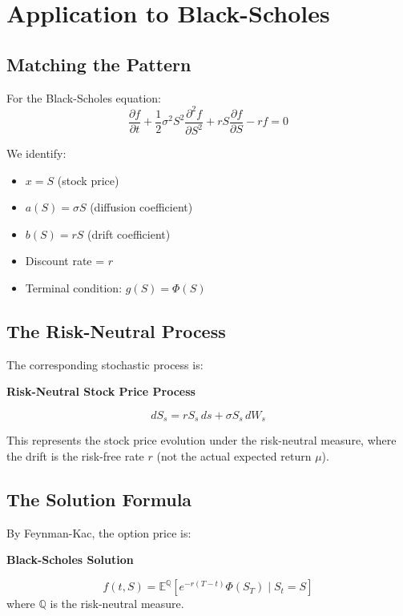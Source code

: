 \documentclass[11pt,a4paper]{article}
\newenvironment{keybox}[1][Key Result]
{\begin{leftbar}\noindent\textbf{\color{theoremblue}#1}\par\vspace{0.5em}}
{\end{leftbar}}
\begin{document}
\section{Application to Black-Scholes}

\subsection{Matching the Pattern}

For the Black-Scholes equation:
\begin{equation}
\frac{\partial f}{\partial t} + \frac{1}{2}\sigma^2 S^2 \frac{\partial^2 f}{\partial S^2} + rS \frac{\partial f}{\partial S} - rf = 0
\end{equation}

We identify:
\begin{itemize}
    \item $x = S$ (stock price)
    \item $a(S) = \sigma S$ (diffusion coefficient)
    \item $b(S) = rS$ (drift coefficient)
    \item Discount rate = $r$
    \item Terminal condition: $g(S) = \Phi(S)$
\end{itemize}

\subsection{The Risk-Neutral Process}

The corresponding stochastic process is:
\begin{keybox}[Risk-Neutral Stock Price Process]
\begin{equation}
dS_s = rS_s \, ds + \sigma S_s \, dW_s
\end{equation}
\end{keybox}

This represents the stock price evolution under the risk-neutral measure, where the drift is the risk-free rate $r$ (not the actual expected return $\mu$).

\subsection{The Solution Formula}

By Feynman-Kac, the option price is:
\begin{keybox}[Black-Scholes Solution]
\begin{equation}
f(t,S) = \mathbb{E}^{\mathbb{Q}}\left[e^{-r(T-t)}\Phi(S_T) \mid S_t = S\right]
\end{equation}
where $\mathbb{Q}$ is the risk-neutral measure.
\end{keybox}
\end{document}
